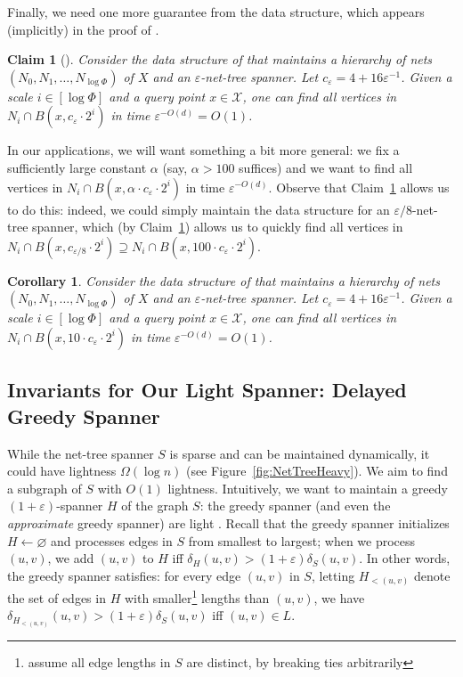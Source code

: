 \documentclass[11pt]{article}
\let\e\varepsilon               %
\newtheorem{claim}[theorem]{Claim}
\newtheorem{corollary}[theorem]{Corollary}
\newcommand{\dist}{\ensuremath{\delta}}
\newcommand{\ddim}{\ensuremath{d}}
\begin{document}
%
Finally, we need one more guarantee from the \cite{gao2004deformable} data structure, which appears (implicitly) in the proof of \cite[Theorem 4.2]{gao2004deformable}.
\begin{claim}[\cite{gao2004deformable}]
\label{clm:fast-ball}
    Consider the data structure of \cite{gao2004deformable} that maintains a hierarchy of nets $(N_0, N_1, \ldots, N_{\log \Phi})$ of $X$  and an $\e$-net-tree spanner. Let $c_\e = 4 + 16\e^{-1}$.
    Given a scale $i \in [\log \Phi]$ and a query point $x \in \mathcal X$,  one can find all vertices in $N_i \cap B(x, c_\e \cdot 2^i)$ in time $\e^{-O(\ddim)} = O(1)$.
\end{claim}
In our applications, we will want something a bit more general: we fix a sufficiently large constant $\alpha$ (say, $\alpha > 100$ suffices) and we want to find all vertices in $N_i \cap B(x, \alpha \cdot c_\e \cdot 2^i)$ in time $\e^{-O(\ddim)}$. Observe that Claim~\ref{clm:fast-ball} allows us to do this: indeed, we could simply maintain the data structure for an $\e/8$-net-tree spanner, which (by Claim~\ref{clm:fast-ball}) allows us to quickly find all vertices in $N_i \cap B(x, c_{\e/8} \cdot 2^i) \supseteq N_i \cap B(x, 100 \cdot c_\e \cdot 2^i)$.
\begin{corollary}
\label{cor:expanded-fast-ball}
    Consider the data structure of \cite{gao2004deformable} that maintains a hierarchy of nets $(N_0, N_1, \ldots, N_{\log \Phi})$ of $X$  and an $\e$-net-tree spanner. Let $c_\e = 4 + 16\e^{-1}$.
    Given a scale $i \in [\log \Phi]$ and a query point $x \in \mathcal X$,  one can find all vertices in $N_i \cap B(x, 10 \cdot c_\e \cdot 2^i)$ in time $\e^{-O(\ddim)} = O(1)$.
%
\end{corollary}
%
%
%
\subsection{Invariants for Our Light Spanner: Delayed Greedy Spanner}
\label{SS:invariants}
%
While the net-tree spanner $S$ is sparse and can be maintained dynamically, it could have lightness $\Omega(\log n)$ (see Figure~\ref{fig:NetTreeHeavy}).
We aim to find a subgraph of $S$ with $O(1)$ lightness. 
Intuitively, we want to maintain a greedy $(1+\e)$-spanner $H$ of the graph $S$: the greedy spanner (and even the \emph{approximate} greedy spanner) are light \cite{BLW19,FS20}. Recall that the greedy spanner initializes $H \gets \varnothing$ and processes edges in $S$ from smallest to largest; when we process $(u,v)$, we add $(u,v)$ to $H$ iff $\dist_{H}(u,v) > (1+\e) \dist_S(u,v)$. In other words, the greedy spanner satisfies: for every edge $(u,v)$ in $S$, letting $H_{<(u,v)}$
denote the set of edges in $H$ with smaller\footnote{assume all edge lengths in $S$ are distinct, by breaking ties arbitrarily} lengths than $(u,v)$, we have 
$\dist_{H_{<(u,v)}}(u,v) > (1+\e) \dist_S(u,v)$ iff $(u,v) \in L$.
%
\end{document}
